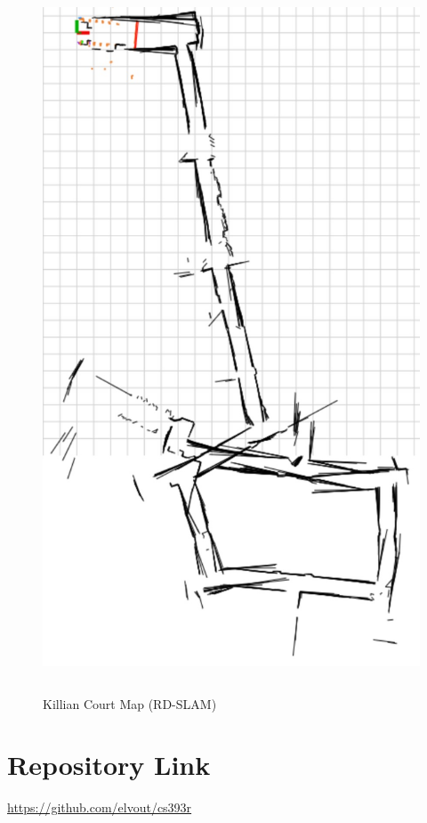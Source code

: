 \documentclass[11pt]{article}
\begin{document}
\begin{figure}[p]
\caption{Killian Court Map (RD-SLAM)}
\centering
\includegraphics[height=8in]{rd-slam-killian.jpg}
\label{fig:rdslam}
\end{figure}

\section{Repository Link}
\href{https://github.com/elvout/cs393r}{https://github.com/elvout/cs393r}


\newpage
\appendix



\end{document}
